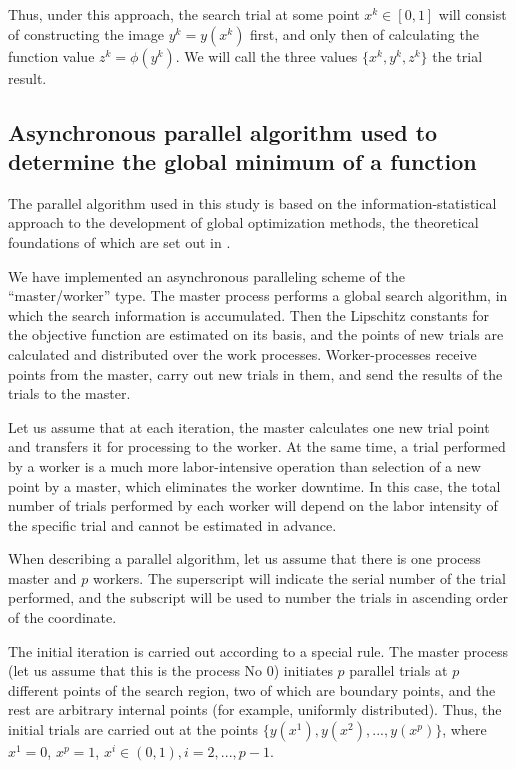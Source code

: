 \documentclass[mathematics,article,submit,pdftex,moreauthors]{Definitions/mdpi}
\begin{document}
Thus, under this approach, the search trial at some point $x^k\in[0,1]$ will consist of constructing the image $y^k=y(x^k)$ first, and only then of calculating the function value $ z^k = \phi(y^k)$.
We will call the three values $\{x^k,y ^k,z^k\}$ the trial result.

\subsection{Asynchronous parallel algorithm used to determine the global minimum of a function}

The parallel algorithm used in this study is based on the information-statistical approach to the development of global optimization methods, the theoretical foundations of which are set out in \cite{Strongin2000}. 

We have implemented an asynchronous paralleling scheme of the ``master/worker'' type. The master process performs a global search algorithm, in which the search information is accumulated. Then the Lipschitz constants for the objective function are estimated on its basis, and the points of new trials are calculated and distributed over the work processes. Worker-processes receive points from the master, carry out new trials in them, and send the results of the trials to the master. 

Let us assume that at each iteration, the master calculates one new trial  point and transfers it for processing to the worker. At the same time, a trial performed by a worker is a much more labor-intensive operation than selection of a new point by a master, which eliminates the worker downtime. 
In this case, the total number of trials performed by each worker  will depend on the labor intensity of the specific trial and cannot be estimated in advance.

When describing a parallel algorithm, let us assume that there is one process master and $p$ workers. The \textcolor[rgb]{1,0,0}{superscript} will indicate the serial number of the trial performed, and the \textcolor[rgb]{1,0,0}{subscript} will be used to number the trials in ascending order of the coordinate.
 
The initial iteration is carried out according to a special rule. The master process (let us assume that this is the process No 0) initiates  $p$ parallel trials at $p$ different points of the search region, two of which are boundary points, and the rest are arbitrary internal points (for example, uniformly distributed). Thus, the initial trials are carried out at the points $\{y(x^1), y(x^2), ...,y(x^p)\}$, where $x^1 = 0$, $x^p = 1$, $x^i\in(0,1), i=2,..., p-1$.
\end{document}
